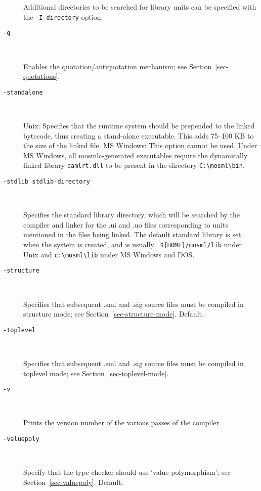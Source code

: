 \documentclass[fleqn]{article}
\begin{document}
\begin{description}
  Additional directories to be searched for library units can be
  specified with the {\tt -I {\rm directory}} option.

\item[{\tt -q}]\mbox{ }

  Enables the quotation/antiquotation mechanism; see
  Section~\ref{sec-quotations}.

\item[{\tt -standalone}]\mbox{ }
  
  Unix: Specifies that the runtime system should be prepended to the
  linked bytecode, thus creating a stand-alone executable.  This adds
  75--100 KB to the size of the linked file.  MS Windows: This option
  cannot be used.  Under MS Windows, all mosmlc-generated executables
  require the dynamically linked library \texttt{camlrt.dll} to be
  present in the directory \verb+C:\mosml\bin+.

\item[{\tt -stdlib {\rm stdlib-directory}}]\mbox{ }

  Specifies the standard library directory, which will be searched by
  the compiler and linker for the .ui and .uo files corresponding to
  units mentioned in the files being linked.  The default standard
  library is set when the system is created, and is usually {\tt
    \$\{HOME\}/mosml/lib} under Unix and \verb#c:\mosml\lib# under MS
  Windows and DOS.

\item[{\tt -structure}]\mbox{ }
  
  Specifies that subsequent .sml and .sig source files must be
  compiled in structure mode; see Section~\ref{sec-structure-mode}.
  Default.

\item[{\tt -toplevel}]\mbox{ }
  
  Specifies that subsequent .sml and .sig source files must be
  compiled in toplevel mode; see Section~\ref{sec-toplevel-mode}.

\item[{\tt -v}]\mbox{ }
  
  Prints the version number of the various passes of the compiler.

\item[{\tt -valuepoly}]\mbox{ }

  Specify that the type checker should use `value polymorphism'; see
  Section~\ref{sec-valuepoly}.  Default.
\end{description}
\end{document}
